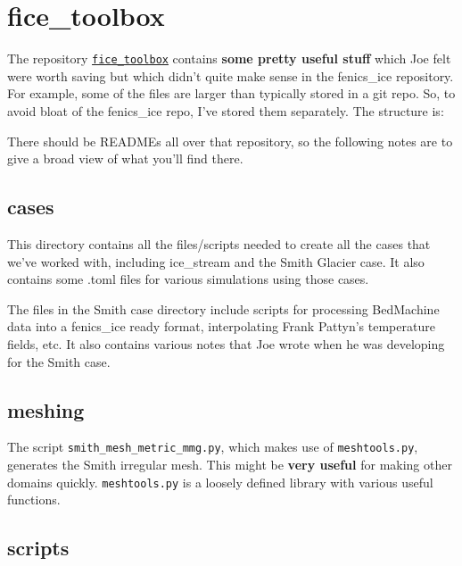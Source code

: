\documentclass[11pt, reqno, nocenter]{article}
\begin{document}
\section{fice\_toolbox} \label{sec:toolbox}

The repository \href{https://github.com/EdiGlacUQ/fice_toolbox}{{\tt fice\_toolbox}} contains \textbf{some pretty useful stuff} which Joe felt were worth saving but which didn't quite make sense in the fenics\_ice repository. For example, some of the files are larger than typically stored in a git repo.
So, to avoid bloat of the fenics\_ice repo, I've stored them separately. The structure is: \\


There should be READMEs all over that repository, so the following notes are to give a broad view of what you'll find there.

\subsection{cases}

This directory contains all the files/scripts needed to create all the cases that we've worked with, including ice\_stream and the Smith Glacier case. It also contains some .toml files for various simulations using those cases.

The files in the Smith case directory include scripts for processing BedMachine data into a fenics\_ice ready format, interpolating Frank Pattyn's temperature fields, etc. It also contains various notes that Joe wrote when he was developing for the Smith case.

\subsection{meshing}

The script {\tt smith\_mesh\_metric\_mmg.py}, which makes use of {\tt meshtools.py}, generates the Smith irregular mesh. This might be \textbf{very useful} for making other domains quickly. {\tt meshtools.py} is a loosely defined library with various useful functions.

\subsection{scripts}
\end{document}
